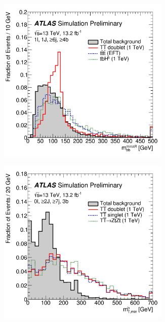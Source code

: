 \begin{figure}[h!]
\begin{subfigure}{0.5\textwidth}
  \centering
  \includegraphics[width=0.9\textwidth]{figures/VLQ/mbb.png}
  \caption{}
  \label{fig:vlq:str:mbbmin}
\end{subfigure}
\begin{subfigure}{0.5\textwidth}
  \centering
  \includegraphics[width=0.9\textwidth]{figures/VLQ/mtbmin.png}
  \caption{}
  \label{fig:vlq:str:mtbmin}
\end{subfigure}


\end{figure}

